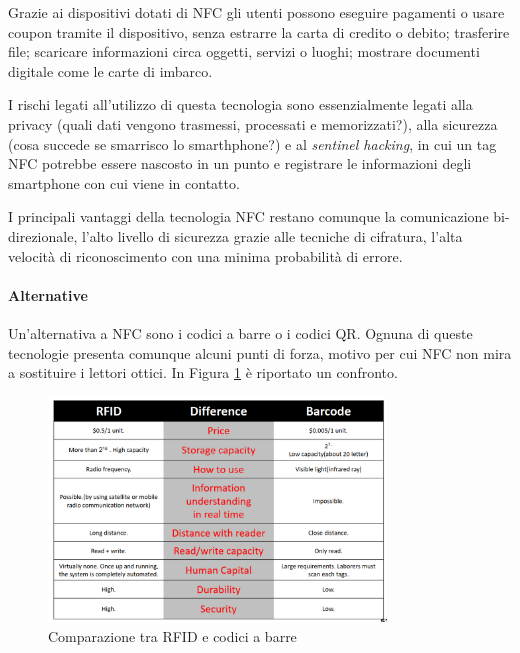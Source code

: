 	Grazie ai dispositivi dotati di NFC gli utenti possono
	eseguire pagamenti o usare coupon tramite il dispositivo, senza estrarre la carta di credito o debito;
	trasferire file;
	scaricare informazioni circa oggetti, servizi o luoghi;
	mostrare documenti digitale come le carte di imbarco.
	
	I rischi legati all'utilizzo di questa tecnologia sono essenzialmente legati
	alla privacy (quali dati vengono trasmessi, processati e memorizzati?),
	alla sicurezza (cosa succede se smarrisco lo smarthphone?)
	e al \emph{sentinel hacking}, in cui un tag NFC potrebbe essere nascosto in un punto e registrare le informazioni degli smartphone con cui viene in contatto.
	
	I principali vantaggi della tecnologia NFC restano comunque la comunicazione bi-direzionale, l'alto livello di sicurezza grazie alle tecniche di cifratura, l'alta velocità di riconoscimento con una minima probabilità di errore.
	
	\paragraph{Alternative}
	Un'alternativa a NFC sono i codici a barre o i codici QR.
	Ognuna di queste tecnologie presenta comunque alcuni punti di forza, motivo per cui NFC non mira a sostituire i lettori ottici.
	In Figura \ref{fig:comparazioneRFID-barcode} è riportato un confronto.
	
	\begin{figure}[h]
		\centering
		\includegraphics[width=0.8\textwidth]{lez7/tabellaComparativaRFID-barcode.png}
		\caption{Comparazione tra RFID e codici a barre}
		\label{fig:comparazioneRFID-barcode}
	\end{figure}
